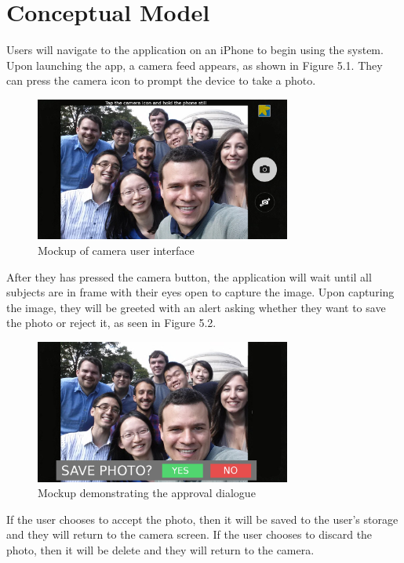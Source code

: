 \chapter{Conceptual Model}

Users will navigate to the application on an iPhone to begin using the system. Upon launching the app, a camera feed appears, as shown in Figure 5.1. They can press the camera icon to prompt the device to take a photo.

\begin{figure}[!h]
    \centering
    \includegraphics[width=0.75\textwidth]{conceptualmodel1}
    \caption{Mockup of camera user interface}
    \label{fig:conceptualmodel1}
\end{figure}

\pagebreak
After they has pressed the camera button, the application will wait until all subjects are in frame with their eyes open to capture the image. Upon capturing the image, they will be greeted with an alert asking whether they want to save the photo or reject it, as seen in Figure 5.2.

\begin{figure}[!h]
    \centering
    \includegraphics[width=0.75\textwidth]{conceptualmodel2}
    \caption{Mockup demonstrating the approval dialogue}
    \label{fig:conceptualmodel2}
\end{figure}

If the user chooses to accept the photo, then it will be saved to the user's storage and they will return to the camera screen. If the user chooses to discard the photo, then it will be delete and they will return to the camera.


